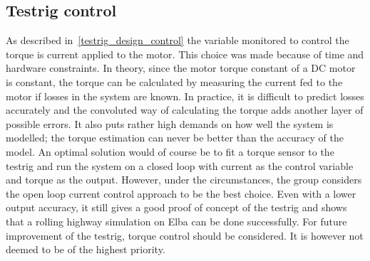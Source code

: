\subsection{Testrig control}\label{sec:discussion_testrig_control}
As described in~\ref{testrig_design_control} the variable monitored to control the torque is current applied to the motor. This choice was made because of time
and hardware constraints. In theory, since the motor torque constant of a DC motor is
constant, the torque can be calculated by measuring the current fed to the
motor if losses in the system are known. In practice, it is difficult to
predict losses accurately and the convoluted way of calculating the torque adds
another layer of possible errors. It also puts rather high demands on how well
the system is modelled; the torque estimation can never be better than the
accuracy of the model. An optimal solution would of course be to fit a torque
sensor to the testrig and run the system on a closed loop with current as the
control variable and torque as the output. However, under the
circumstances, the group considers the open loop current control approach to be
the best choice. Even with a lower output accuracy, it still gives a
good proof of concept of the testrig and shows that a rolling highway simulation
on Elba can be done successfully.
For future improvement of the testrig, torque control should be considered. It is however not deemed to be of the highest priority. %



